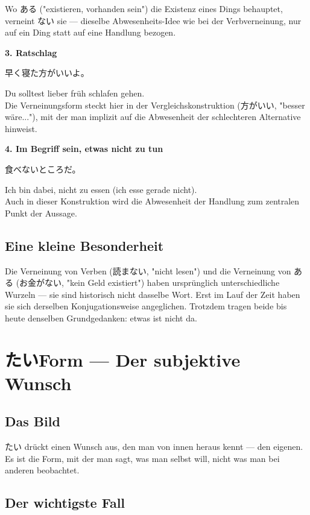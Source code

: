 \documentclass[12pt]{book}
\begin{document}
Wo ある ("existieren, vorhanden sein") die Existenz eines Dings behauptet, verneint ない sie — dieselbe Abwesenheits-Idee wie bei der Verbverneinung, nur auf ein Ding statt auf eine Handlung bezogen.

\textbf{3. Ratschlag}
\par\quad 早く寝た方がいいよ。\\
\par\quad Du solltest lieber früh schlafen gehen.\\

Die Verneinungsform steckt hier in der Vergleichskonstruktion (方がいい, "besser wäre..."), mit der man implizit auf die Abwesenheit der schlechteren Alternative hinweist.

\textbf{4. Im Begriff sein, etwas nicht zu tun}
\par\quad 食べないところだ。\\
\par\quad Ich bin dabei, nicht zu essen (ich esse gerade nicht).\\

Auch in dieser Konstruktion wird die Abwesenheit der Handlung zum zentralen Punkt der Aussage.

\section*{Eine kleine Besonderheit}

Die Verneinung von Verben (読まない, "nicht lesen") und die Verneinung von ある (お金がない, "kein Geld existiert") haben ursprünglich unterschiedliche Wurzeln — sie sind historisch nicht dasselbe Wort. Erst im Lauf der Zeit haben sie sich derselben Konjugationsweise angeglichen. Trotzdem tragen beide bis heute denselben Grundgedanken: etwas ist nicht da.


\chapter{たいForm — Der subjektive Wunsch}

\section*{Das Bild}

たい drückt einen Wunsch aus, den man von innen heraus kennt — den eigenen. Es ist die Form, mit der man sagt, was man selbst will, nicht was man bei anderen beobachtet.

\section*{Der wichtigste Fall}
\end{document}
